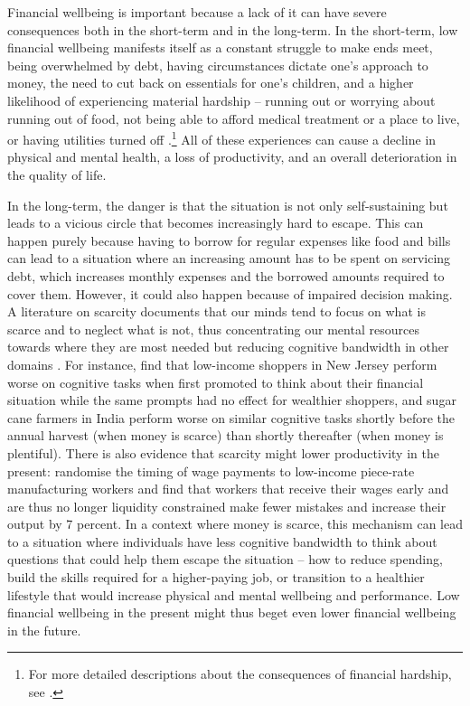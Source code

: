 Financial wellbeing is important because a lack of it can have severe
consequences both in the short-term and in the long-term. In the short-term,
low financial wellbeing manifests itself as a constant struggle to make ends meet, being
overwhelmed by debt, having circumstances dictate one's approach to
money, the need to cut back on essentials for one's children, and a higher likelihood of experiencing material hardship -- running out or worrying about running out of food, not being able to afford medical treatment or a place to live, or having
utilities turned off \citep{cfpb2017financial}.\footnote{For more detailed descriptions about the consequences of
    financial hardship, see \citet{cfpb2017financial, mps2018building,
stepchange2017strengthening}.} All of these experiences can cause a decline in
physical and mental health, a loss of productivity, and an overall
deterioration in the quality of life.

In the long-term, the danger is that the situation is not only self-sustaining
but leads to a vicious circle that becomes increasingly hard to escape. This can happen purely because having to borrow for regular expenses like food and bills can lead to a situation where an increasing amount has to be spent on servicing debt, which increases monthly expenses and the borrowed amounts required to cover them. However, it could also happen because of impaired decision making. A
literature on scarcity documents that our minds tend to focus on what is
scarce and to neglect what is not, thus concentrating our mental resources towards where they are most needed but reducing cognitive bandwidth in other domains \citep{shah2012some, mullainathan2013scarcity,
haushofer2014psychology}. For instance, \citet{mani2013poverty} find that
low-income shoppers in New Jersey perform worse on cognitive tasks when first
promoted to think about their financial situation while the same prompts had no
effect for wealthier shoppers, and sugar cane farmers in India perform worse on
similar cognitive tasks shortly before the annual harvest (when money is
scarce) than shortly thereafter (when money is plentiful). There is also
evidence that scarcity might lower productivity in the present:
\citet{kaur2021financial} randomise the timing of wage payments to low-income
piece-rate manufacturing workers and find that workers that receive their wages
early and are thus no longer liquidity constrained make fewer mistakes and
increase their output by 7 percent. In a context where money is scarce, this mechanism can lead to a situation where individuals have less cognitive bandwidth to think about questions that could help them escape the situation -- how to reduce spending, build the skills required for a higher-paying job, or transition to a healthier lifestyle that would increase physical and mental wellbeing and performance. Low financial wellbeing in the present might thus beget even lower financial wellbeing in the future.

